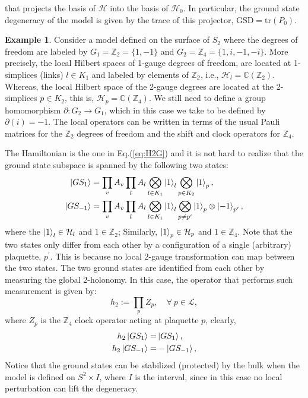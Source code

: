 \documentclass[titlepage,11pt]{article}
\theoremstyle{plain}%
\theoremstyle{definition}
\newtheorem{exmp}[thm]{Example}
\theoremstyle{remark}
\begin{document}
that projects the basis of $\mathcal{H}$ into the basis of $\mathcal{H_0}$. In particular, the ground state degeneracy of the model is given by the trace of this projector, $\text{GSD}=\text{tr}(P_0)$.
\begin{exmp}

Consider a model defined on the surface of $S_2$ where the degrees of freedom are labeled by $G_1=\mathbb{Z}_2=\{1,-1\}$ and $G_2=\mathbb{Z}_4=\{1,i,-1,-i\}$. More precisely, the local Hilbert spaces of 1-gauge degrees of freedom, are located at 1-simplices (links) $l \in K_1$ and labeled by elements of $\mathbb{Z_2}$, i.e., $\mathcal{H}_l=\mathbb{C}(\mathbb{Z}_2)$. Whereas, the local Hilbert space of the 2-gauge degrees are located at the 2-simplices $p \in K_2$, this is, $\mathcal{H}_p=\mathbb{C}(\mathbb{Z}_4)$. We still need to define a group homomorphism $\partial:G_2 \rightarrow G_1$, which in this case we take to be defined by $\partial(i)=-1$.  The local operators can be written in terms of the usual Pauli matrices for the $\mathbb{Z}_2$ degrees of freedom and the shift and clock operators for $\mathbb{Z}_4$.

The Hamiltonian is the one in Eq.(\ref{eq:H2G}) and it is not hard to realize that the ground state subspace is spanned by the following two states:
\begin{align*}
\ket{GS_1} &=\prod_{v}A_v\prod_{l}A_l\bigotimes_{l \in K_1}\ket{1}_l \bigotimes_{p \in K_2} \ket{1}_p,\\
\ket{GS_{-1}} &=\prod_{v}A_v\prod_{l}A_l\bigotimes_{l \in K_1}\ket{1}_l \bigotimes_{p \neq p^{\prime}} \ket{1}_p \otimes \ket{-1}_{p^{\prime}},
\end{align*}
where the  $\ket{1}_l \in \mathcal{H}_l$ and $1 \in \mathbb{Z}_2$; Similarly, $\ket{1}_p \in \mathcal{H}_p$ and $1 \in \mathbb{Z}_4$. Note that the two states only differ from each other by a configuration of a single (arbitrary) plaquette, $p^{\prime}$. This is because no local 2-gauge transformation can map between the two states. 
 The two ground states are identified from each other by measuring the global 2-holonomy. In this case, the operator that performs such measurement is given by:
\[h_2:=\prod_{p}Z_p, \quad \forall \ p\in \mathcal{L},\]
where $Z_p$ is the $\mathbb{Z}_4$ clock operator acting at plaquette $p$, clearly,
\begin{align*}
h_2\ket{GS_1}=&\ket{GS_1},\\
h_2\ket{GS_{-1}}=&-\ket{GS_{-1}},
\end{align*}
Notice that the ground states can be stabilized (protected) by the bulk when the model is defined on $S^2\times I$, where $I$ is the interval, since in this case no local perturbation can lift the degeneracy.
\end{exmp}
\end{document}
